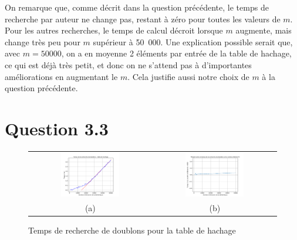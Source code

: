 \documentclass[a4paper,12pt]{article}
\numberwithin{equation}{section}
\begin{document}
On remarque que, comme décrit dans la question précédente, le temps de recherche par auteur ne change pas, restant à zéro pour toutes les valeurs de $m$. Pour les autres recherches, le temps de calcul décroit lorsque $m$ augmente, mais change très peu pour $m$ supérieur à 50~000. Une explication possible serait que, avec $m = 50 000$, on a en moyenne 2 éléments par entrée de la table de hachage, ce qui est déjà très petit, et donc on ne s'attend pas à d'importantes améliorations en augmentant le $m$. Cela justifie aussi notre choix de $m$ à la question précédente.

\section*{Question 3.3}

\begin{figure}[ht]
\centering
\begin{tabular}{@{} c @{} c @{}}
\includegraphics[width=0.5\textwidth]{FigQues3_3_hach_1} & \includegraphics[width=0.5\textwidth]{FigQues3_3_hach_2} \tabularnewline
(a) & (b) \tabularnewline
\end{tabular}
\caption{Temps de recherche de doublons pour la table de hachage}
\label{FigQues3_3_hach}
\end{figure}
\end{document}
